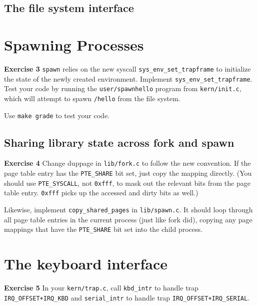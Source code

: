 \documentclass[11pt]{article}
\begin{document}
\subsection{The file system interface}

\section{Spawning Processes}
\begin{framed}
\noindent\textbf{Exercise 3} \lstinline|spawn| relies on the new syscall \lstinline|sys_env_set_trapframe| to initialize the state of the newly created environment. Implement \lstinline|sys_env_set_trapframe|. Test your code by running the \lstinline|user/spawnhello| program from \lstinline|kern/init.c|, which will attempt to spawn \lstinline|/hello| from the file system.

Use \lstinline|make grade| to test your code.
\end{framed}

\subsection{Sharing library state across fork and spawn}
\begin{framed}
\noindent\textbf{Exercise 4} Change duppage in \lstinline|lib/fork.c| to follow the new convention. If the page table entry has the \lstinline|PTE_SHARE| bit set, just copy the mapping directly. (You should use \lstinline|PTE_SYSCALL|, not \lstinline|0xfff|, to mask out the relevant bits from the page table entry. \lstinline|0xfff| picks up the accessed and dirty bits as well.)

Likewise, implement \lstinline|copy_shared_pages| in \lstinline|lib/spawn.c|. It should loop through all page table entries in the current process (just like fork did), copying any page mappings that have the \lstinline|PTE_SHARE| bit set into the child process.
\end{framed}

\section{The keyboard interface}
\begin{framed}
\noindent\textbf{Exercise 5} In your \lstinline|kern/trap.c|, call \lstinline|kbd_intr| to handle trap \lstinline|IRQ_OFFSET+IRQ_KBD| and \lstinline|serial_intr| to handle trap \lstinline|IRQ_OFFSET+IRQ_SERIAL|.
\end{framed}
\end{document}
